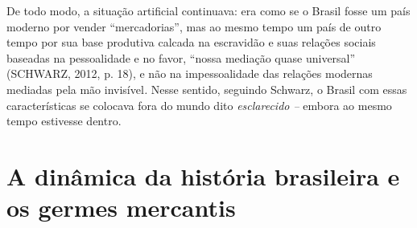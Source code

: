 De todo modo, a situação artificial continuava: era como se o Brasil
fosse um país moderno por vender ``mercadorias'', mas ao mesmo tempo um
país de outro tempo por sua base produtiva calcada na escravidão e suas
relações sociais baseadas na pessoalidade e no favor, ``nossa mediação
quase universal'' (SCHWARZ, 2012, p. 18), e não na impessoalidade das
relações modernas mediadas pela mão invisível\emph{.} Nesse sentido,
seguindo Schwarz, o Brasil com essas características se colocava fora do
mundo dito \emph{esclarecido --} embora ao mesmo tempo estivesse dentro.

\section{A dinâmica da história brasileira e os germes mercantis}

